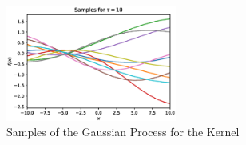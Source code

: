 \documentclass{article}[12pt]
\begin{document}
\begin{enumerate}
\begin{figure}
	\centering
\includegraphics[width=0.5\textwidth]{./img/problem1.eps}
\caption{\label{fig:gauss_prob1} Samples of the Gaussian Process for the Kernel}
\end{figure}

\end{enumerate}
\end{document}
